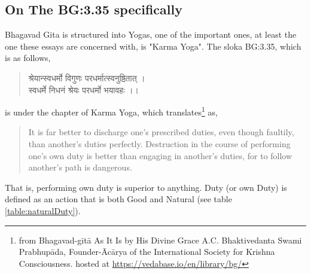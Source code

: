 \documentclass[a4paper]{article}
\begin{document}
\subsection{On The BG:3.35 specifically}
Bhagavad Gita is structured into Yogas, one of the important ones, at least the one these essays are concerned with, 
is "Karma Yoga". The sloka BG:3.35, which is as follows,
\begin{sanskrit}
\begin{quote}
श्रेयान्स्वधर्मो विगुणः परधर्मात्स्वनुष्ठितात् ।
\\स्वधर्मे निधनं श्रेयः परधर्मो भयावहः ।।
\end{quote}
\end{sanskrit}
is under the chapter of Karma Yoga, which translates\footnote{from Bhagavad-gītā As It Is by His Divine Grace A.C. Bhaktivedanta 
Swami Prabhupāda, Founder-Ācārya of the International Society for Krishna Consciousness. hosted at 
\href{https://vedabase.io/en/library/bg/}{https://vedabase.io/en/library/bg/}} as,
\begin{quote}
It is far better to discharge one’s prescribed duties, even though faultily, than another’s duties perfectly. 
Destruction in the course of performing one’s own duty is better than engaging in another’s duties, for to follow another’s 
path is dangerous.
\end{quote}
That is, performing own duty is superior to anything. Duty (or own Duty) is defined as an action 
that is both Good and Natural (see table \ref{table:naturalDuty}).
\end{document}
